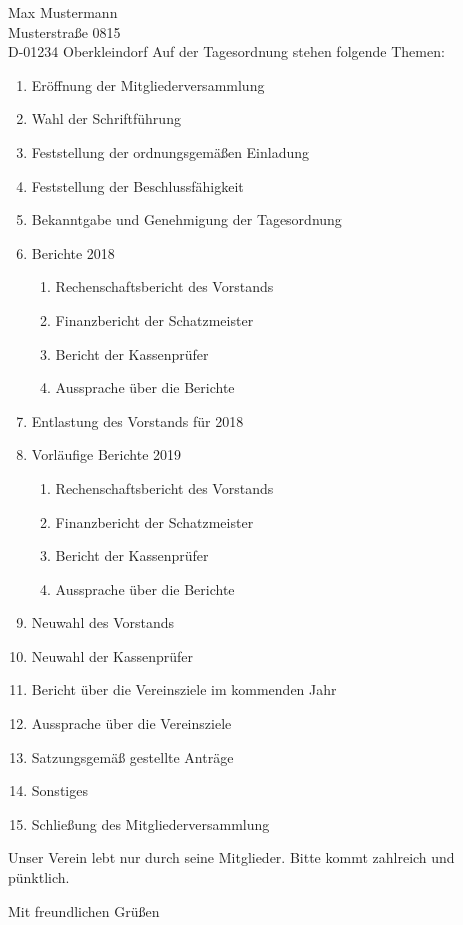 \documentclass[../Vorlagen/de-RSE_Brief,a4paper]{scrlttr2}
\begin{document}
\begin{letter}{
    Max Mustermann\\
    Musterstraße 0815\\
    D-01234 Oberkleindorf
}
\clearpage
\vspace{2em}
Auf der Tagesordnung stehen folgende Themen:
\begin{enumerate}
\setlength\itemsep{0em}
\item Eröffnung der Mitgliederversammlung
\item Wahl der Schriftführung
\item Feststellung der ordnungsgemäßen Einladung
\item Feststellung der Beschlussfähigkeit
\item Bekanntgabe und Genehmigung der Tagesordnung
\item Berichte 2018
\begin{enumerate}
 \item Rechenschaftsbericht des Vorstands
 \item Finanzbericht der Schatzmeister
 \item Bericht der Kassenprüfer
 \item Aussprache über die Berichte
\end{enumerate}
\item Entlastung des Vorstands für 2018
\item Vorläufige Berichte 2019
\begin{enumerate}
 \item Rechenschaftsbericht des Vorstands
 \item Finanzbericht der Schatzmeister
 \item Bericht der Kassenprüfer
 \item Aussprache über die Berichte
\end{enumerate}
\item Neuwahl des Vorstands
\item Neuwahl der Kassenprüfer
\item Bericht über die Vereinsziele im kommenden Jahr
\item Aussprache über die Vereinsziele
\item Satzungsgemäß gestellte Anträge
\item Sonstiges
\item Schließung des Mitgliederversammlung
\end{enumerate}

Unser Verein lebt nur durch seine Mitglieder. Bitte kommt zahlreich und pünktlich.

\closing{Mit freundlichen Grüßen}
\end{letter}
\end{document}
